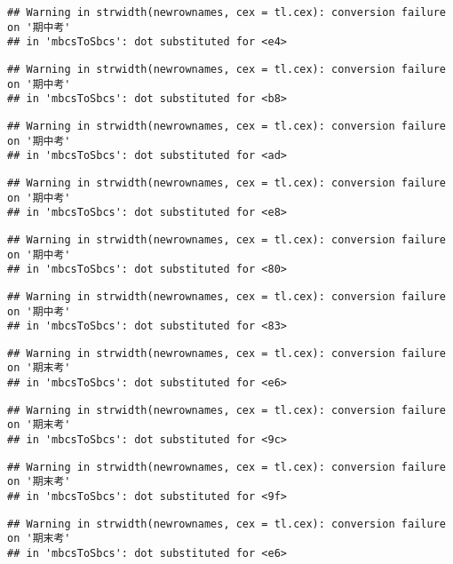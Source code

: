 \documentclass[
]{book}
\begin{document}
\begin{verbatim}
## Warning in strwidth(newrownames, cex = tl.cex): conversion failure on '期中考'
## in 'mbcsToSbcs': dot substituted for <e4>
\end{verbatim}

\begin{verbatim}
## Warning in strwidth(newrownames, cex = tl.cex): conversion failure on '期中考'
## in 'mbcsToSbcs': dot substituted for <b8>
\end{verbatim}

\begin{verbatim}
## Warning in strwidth(newrownames, cex = tl.cex): conversion failure on '期中考'
## in 'mbcsToSbcs': dot substituted for <ad>
\end{verbatim}

\begin{verbatim}
## Warning in strwidth(newrownames, cex = tl.cex): conversion failure on '期中考'
## in 'mbcsToSbcs': dot substituted for <e8>
\end{verbatim}

\begin{verbatim}
## Warning in strwidth(newrownames, cex = tl.cex): conversion failure on '期中考'
## in 'mbcsToSbcs': dot substituted for <80>
\end{verbatim}

\begin{verbatim}
## Warning in strwidth(newrownames, cex = tl.cex): conversion failure on '期中考'
## in 'mbcsToSbcs': dot substituted for <83>
\end{verbatim}

\begin{verbatim}
## Warning in strwidth(newrownames, cex = tl.cex): conversion failure on '期末考'
## in 'mbcsToSbcs': dot substituted for <e6>
\end{verbatim}

\begin{verbatim}
## Warning in strwidth(newrownames, cex = tl.cex): conversion failure on '期末考'
## in 'mbcsToSbcs': dot substituted for <9c>
\end{verbatim}

\begin{verbatim}
## Warning in strwidth(newrownames, cex = tl.cex): conversion failure on '期末考'
## in 'mbcsToSbcs': dot substituted for <9f>
\end{verbatim}

\begin{verbatim}
## Warning in strwidth(newrownames, cex = tl.cex): conversion failure on '期末考'
## in 'mbcsToSbcs': dot substituted for <e6>
\end{verbatim}
\end{document}
